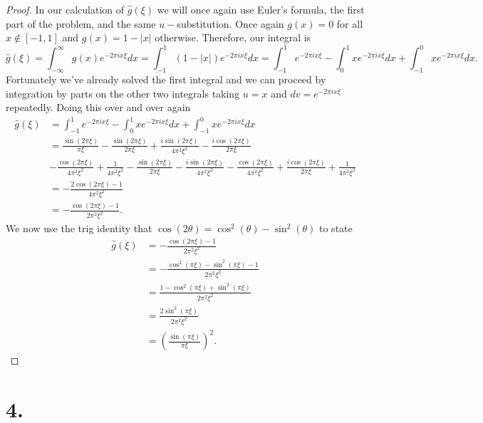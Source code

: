 \documentclass{article}
\begin{document}
\begin{proof}
    In our calculation of $\hat{g}(\xi)$ we will once again use Euler's formula, the first part of the problem, and the same $u-$substitution. Once again $g(x) = 0$ for all $x \notin [-1, 1]$ and $g(x) = 1 - |x|$ otherwise. Therefore, our integral is 
    \[
    \hat{g}(\xi) = \int_{-\infty}^{\infty} g(x)e^{-2 \pi i x \xi} dx = \int_{-1}^1 (1 - |x|)e^{-2 \pi i x \xi}dx = \int_{-1}^1e^{- 2 \pi i x \xi} - \int_0^1xe^{-2 \pi i x \xi} dx + \int_{-1}^0 xe^{-2 \pi i x \xi}dx.   
    \]
    Fortunately we've already solved the first integral and we can proceed by integration by parts on the other two integrals taking $u = x$ and $dv = e^{- 2\pi i x \xi}$ repeatedly. Doing this over and over again
    \begin{align*}
        \hat{g}(\xi) &= \int_{-1}^1e^{- 2 \pi i x \xi} - \int_0^1xe^{-2 \pi i x \xi} dx + \int_{-1}^0 xe^{-2 \pi i x \xi}dx \\
        &= \frac{\sin(2 \pi \xi)}{\pi \xi} - \frac{\sin(2 \pi \xi)}{2 \pi \xi} + \frac{i \sin(2 \pi \xi)}{4 \pi^2 \xi^2} - \frac{i \cos( 2\pi \xi)}{2 \pi \xi} \\
        &- \frac{\cos(2 \pi \xi)}{4 \pi^2 \xi^2} + \frac{1}{4 \pi^2 \xi^2} - \frac{\sin(2\pi \xi)}{2 \pi \xi} - \frac{i \sin(2 \pi \xi)}{4 \pi^2\xi^2} - \frac{\cos( 2\pi \xi)}{4 \pi^2 \xi^2} + \frac{i \cos(2 \pi \xi)}{2 \pi \xi} + \frac{1}{4 \pi^2 \xi^2}\\
        &= -\frac{2 \cos(2 \pi \xi) - 1}{4 \pi^2 \xi^2}\\
        &= -\frac{\cos(2 \pi \xi) - 1}{2 \pi^2 \xi^2}.
    \end{align*}
    We now use the trig identity that $\cos(2 \theta) = \cos^2(\theta) - \sin^2(\theta)$ to state
    \begin{align*}
        \hat{g}(\xi) &= -\frac{\cos(2 \pi \xi) - 1}{2 \pi^2\xi^2}\\
        &= -\frac{\cos^2(\pi \xi) - \sin^2(\pi \xi) - 1}{2 \pi^2\xi^2} \\
        &= \frac{1 -\cos^2(\pi \xi) + \sin^{2}(\pi \xi) }{2 \pi^2 \xi^2} \\
        &= \frac{2 \sin^2(\pi \xi)}{2 \pi^2 \xi^2} \\
        &= \left( \frac{\sin(\pi \xi)}{\pi \xi} \right)^2.
    \end{align*}
\end{proof}

\section*{4.}
\end{document}
